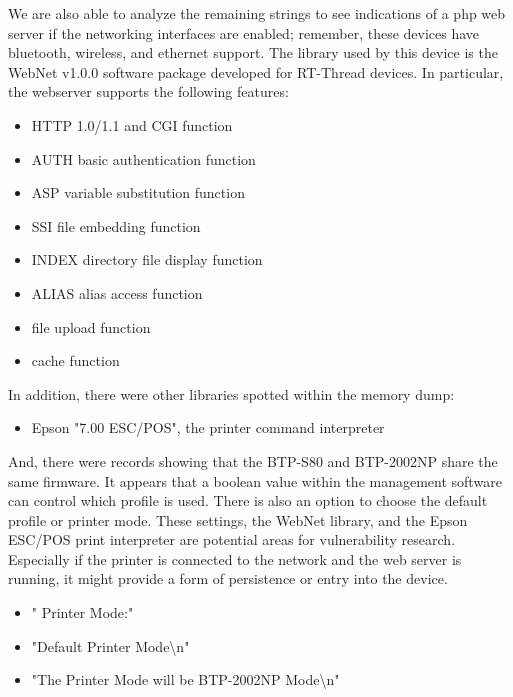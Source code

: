 We are also able to analyze the remaining strings to see indications of a php web server if the networking interfaces are enabled; remember, these devices have bluetooth, wireless, and ethernet support. The library used by this device is the WebNet v1.0.0 software package developed for RT-Thread devices. In particular, the webserver supports the following features:

\begin{itemize}
    \item HTTP 1.0/1.1 and CGI function
    \item AUTH basic authentication function
    \item ASP variable substitution function
    \item SSI file embedding function
    \item INDEX directory file display function
    \item ALIAS alias access function
    \item file upload function
    \item cache function
\end{itemize}

In addition, there were other libraries spotted within the memory dump:

\begin{itemize}
    \item Epson "7.00 ESC/POS", the printer command interpreter
\end{itemize}

And, there were records showing that the BTP-S80 and BTP-2002NP share the same firmware. It appears that a boolean value within the management software can control which profile is used. There is also an option to choose the default profile or printer mode. These settings, the WebNet library, and the Epson ESC/POS print interpreter are potential areas for vulnerability research. Especially if the printer is connected to the network and the web server is running, it might provide a form of persistence or entry into the device. 

\begin{itemize}
    \item "  Printer Mode:"
    \item "Default Printer Mode\textbackslash n"
    \item "The Printer Mode will be BTP-2002NP Mode\textbackslash n"
\end{itemize}

